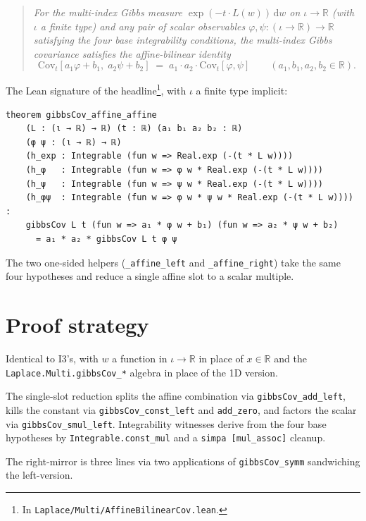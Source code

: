 \documentclass[11pt]{article}
\begin{document}
\begin{quote}\itshape
For the multi-index Gibbs measure $\exp(-t \cdot L(w))\,\mathrm{d}w$
on $\iota \to \mathbb{R}$ (with $\iota$ a finite type) and any pair of
scalar observables $\varphi, \psi : (\iota \to \mathbb{R}) \to \mathbb{R}$
satisfying the four base integrability conditions, the multi-index
Gibbs covariance satisfies the affine-bilinear identity
\[
  \mathrm{Cov}_t[a_1 \varphi + b_1,\; a_2 \psi + b_2]
  \;=\; a_1 \cdot a_2 \cdot \mathrm{Cov}_t[\varphi, \psi]
  \qquad (a_1, b_1, a_2, b_2 \in \mathbb{R}).
\]
\end{quote}

The Lean signature of the headline\footnote{In
\texttt{Laplace/Multi/AffineBilinearCov.lean}.}, with $\iota$ a finite
type implicit:

\begin{verbatim}
theorem gibbsCov_affine_affine
    (L : (ι → ℝ) → ℝ) (t : ℝ) (a₁ b₁ a₂ b₂ : ℝ)
    (φ ψ : (ι → ℝ) → ℝ)
    (h_exp : Integrable (fun w => Real.exp (-(t * L w))))
    (h_φ   : Integrable (fun w => φ w * Real.exp (-(t * L w))))
    (h_ψ   : Integrable (fun w => ψ w * Real.exp (-(t * L w))))
    (h_φψ  : Integrable (fun w => φ w * ψ w * Real.exp (-(t * L w)))) :
    gibbsCov L t (fun w => a₁ * φ w + b₁) (fun w => a₂ * ψ w + b₂)
      = a₁ * a₂ * gibbsCov L t φ ψ
\end{verbatim}

The two one-sided helpers (\texttt{\_affine\_left} and
\texttt{\_affine\_right}) take the same four hypotheses and reduce a
single affine slot to a scalar multiple.

\section{Proof strategy}

Identical to I3's, with $w$ a function in $\iota \to \mathbb{R}$
in place of $x \in \mathbb{R}$ and the \texttt{Laplace.Multi.gibbsCov\_*}
algebra in place of the 1D version.

The single-slot reduction splits the affine combination via
\texttt{gibbsCov\_add\_left}, kills the constant via
\texttt{gibbsCov\_const\_left} and \texttt{add\_zero}, and factors the
scalar via \texttt{gibbsCov\_smul\_left}. Integrability witnesses
derive from the four base hypotheses by
\texttt{Integrable.const\_mul} and a \texttt{simpa [mul\_assoc]} cleanup.

The right-mirror is three lines via two applications of
\texttt{gibbsCov\_symm} sandwiching the left-version.
\end{document}
